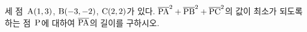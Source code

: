 세 점~$\mathrm{A}(1{,}\mkern3mu\mathopen{}3)$, $\mathrm{B}(-3{,}\mkern3mu\mathopen{}-2)$, $\mathrm{C}(2{,}\mkern3mu\mathopen{}2)$가 있다. $\overline{\mathrm{PA}}^2+\overline{\mathrm{PB}}^2+\overline{\mathrm{PC}}^2$의 값이 최소가 되도록 하는 점~$\mathrm{P}$에 대하여 $\overline{\mathrm{PA}}$의 길이를 구하시오.
